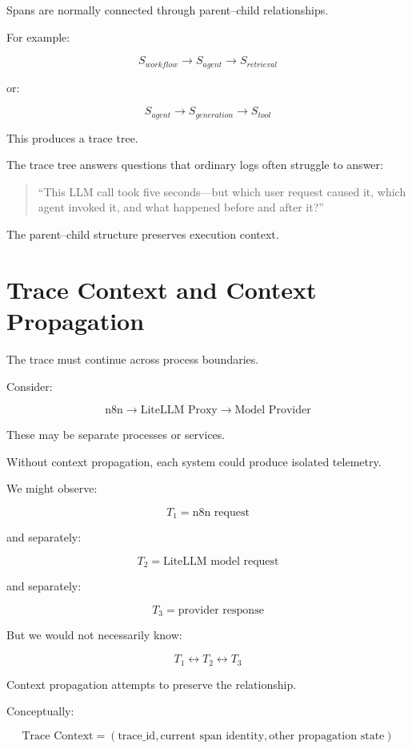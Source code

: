 \documentclass[11pt,a4paper]{article}
\begin{document}
Spans are normally connected through parent--child relationships.

For example:

\[
S_{workflow}
\rightarrow
S_{agent}
\rightarrow
S_{retrieval}
\]

or:

\[
S_{agent}
\rightarrow
S_{generation}
\rightarrow
S_{tool}
\]

This produces a trace tree.

The trace tree answers questions that ordinary logs often struggle to answer:

\begin{quote}
``This LLM call took five seconds---but which user request caused it, which agent invoked it, and what happened before and after it?''
\end{quote}

The parent--child structure preserves execution context.

\section{Trace Context and Context Propagation}

The trace must continue across process boundaries.

Consider:

\[
\text{n8n}
\rightarrow
\text{LiteLLM Proxy}
\rightarrow
\text{Model Provider}
\]

These may be separate processes or services.

Without context propagation, each system could produce isolated telemetry.

We might observe:

\[
T_1 = \text{n8n request}
\]

and separately:

\[
T_2 = \text{LiteLLM model request}
\]

and separately:

\[
T_3 = \text{provider response}
\]

But we would not necessarily know:

\[
T_1 \leftrightarrow T_2 \leftrightarrow T_3
\]

Context propagation attempts to preserve the relationship.

Conceptually:

\[
\boxed{
\text{Trace Context} = (
\text{trace\_id},
\text{current span identity},
\text{other propagation state}
)
}
\]
\end{document}
